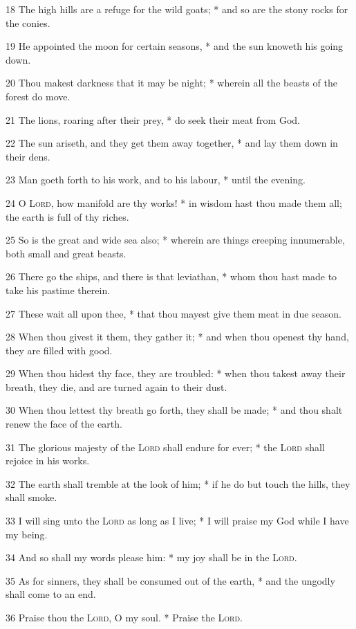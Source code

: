 18 The high hills are a refuge for the wild goats; * and so are the stony rocks for the conies.\par
19 He appointed the moon for certain seasons, * and the sun knoweth his going down.\par
20 Thou makest darkness that it may be night; * wherein all the beasts of the forest do move.\par
21 The lions, roaring after their prey, * do seek their meat from God.\par
22 The sun ariseth, and they get them away together, * and lay them down in their dens.\par
23 Man goeth forth to his work, and to his labour, * until the evening.\par
24 O {\textsc{Lord}}, how manifold are thy works! * in wisdom hast thou made them all; the earth is full of thy riches.\par
25 So is the great and wide sea also; * wherein are things creeping innumerable, both small and great beasts.\par
26 There go the ships, and there is that leviathan, * whom thou hast made to take his pastime therein.\par
27 These wait all upon thee, * that thou mayest give them meat in due season.\par
28 When thou givest it them, they gather it; * and when thou openest thy hand, they are filled with good.\par
29 When thou hidest thy face, they are troubled: * when thou takest away their breath, they die, and are turned again to their dust.\par
30 When thou lettest thy breath go forth, they shall be made; * and thou shalt renew the face of the earth.\par
31 The glorious majesty of the {\textsc{Lord}} shall endure for ever; * the {\textsc{Lord}} shall rejoice in his works.\par
32 The earth shall tremble at the look of him; * if he do but touch the hills, they shall smoke.\par
33 I will sing unto the {\textsc{Lord}} as long as I live; * I will praise my God while I have my being.\par
34 And so shall my words please him: * my joy shall be in the {\textsc{Lord}}.\par
35 As for sinners, they shall be consumed out of the earth, * and the ungodly shall come to an end.\par
36 Praise thou the {\textsc{Lord}}, O my soul. * Praise the {\textsc{Lord}}.
